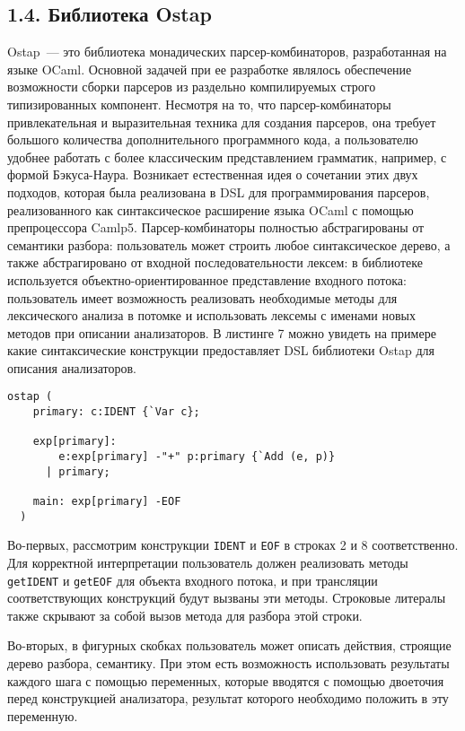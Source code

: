 \subsection*{1.4. Библиотека Ostap}
Ostap~--- это библиотека монадических парсер-комбинаторов, разработанная на языке OCaml. Основной задачей при ее разработке являлось обеспечение возможности сборки парсеров из раздельно компилируемых строго типизированных компонент. Несмотря на то, что парсер-комбинаторы привлекательная и выразительная техника для создания парсеров, она требует большого количества дополнительного программного кода, а пользователю удобнее работать с более классическим представлением грамматик, например, с формой Бэкуса-Наура. Возникает естественная идея о сочетании этих двух подходов, которая была реализована в DSL для программирования парсеров, реализованного как синтаксическое расширение языка OCaml с помощью препроцессора Camlp5. Парсер-комбинаторы полностью абстрагированы от семантики разбора: пользователь может строить любое синтаксическое дерево, а также абстрагировано от входной последовательности лексем: в библиотеке используется объектно-ориентированное представление входного потока: пользователь имеет возможность реализовать необходимые методы для лексического анализа в потомке и использовать лексемы с именами новых методов при описании анализаторов. В листинге 7 можно увидеть на примере какие синтаксические конструкции предоставляет DSL библиотеки Ostap для описания анализаторов.

\begin{lstlisting}[basicstyle=\small, caption=Парсеры в синтаксисе Ostap]
  ostap (
    primary: c:IDENT {`Var c};

    exp[primary]:
        e:exp[primary] -"+" p:primary {`Add (e, p)}
      | primary;

    main: exp[primary] -EOF
  )
\end{lstlisting}

Во-первых, рассмотрим конструкции \lstinline|IDENT| и \lstinline|EOF| в строках 2 и 8 соответственно. Для корректной интерпретации пользователь должен реализовать методы \lstinline|getIDENT| и \lstinline|getEOF| для объекта входного потока, и при трансляции соответствующих конструкций будут вызваны эти методы. Строковые литералы также скрывают за собой вызов метода для разбора этой строки.

Во-вторых, в фигурных скобках пользователь может описать действия, строящие дерево разбора, семантику. При этом есть возможность использовать результаты каждого шага с помощью переменных, которые вводятся с помощью двоеточия перед конструкцией анализатора, результат которого необходимо положить в эту переменную.

